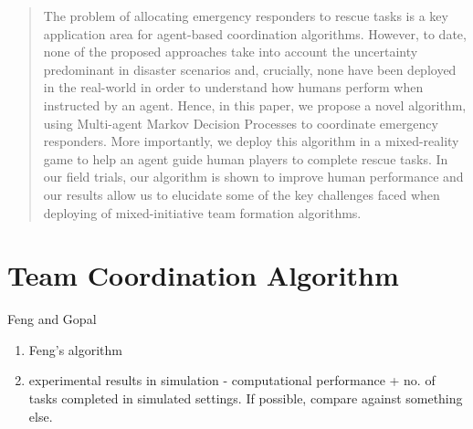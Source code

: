 \documentclass{aamas2014}
\begin{document}
\begin{abstract}
The problem of allocating emergency responders to rescue tasks is a key application area for agent-based coordination algorithms. However, to date, none of the proposed approaches take into account the uncertainty predominant in disaster scenarios and, crucially, none have been deployed in the real-world in order to understand how humans perform when instructed by an agent. Hence, in this paper, we propose a novel algorithm, using Multi-agent Markov Decision Processes to coordinate emergency responders. More importantly, we deploy this algorithm in a mixed-reality game to help an agent guide human players to complete rescue tasks. In our field trials, our algorithm is shown to improve human performance and our results allow us to elucidate some of the key challenges faced when  deploying of mixed-initiative team formation algorithms. \end{abstract}











\section{Team Coordination Algorithm}
Feng and Gopal
\begin{enumerate}
\item Feng's algorithm
\item experimental results in simulation - computational performance + no. of tasks completed in simulated settings. If possible, compare against something else.
\end{enumerate}
\end{document}
